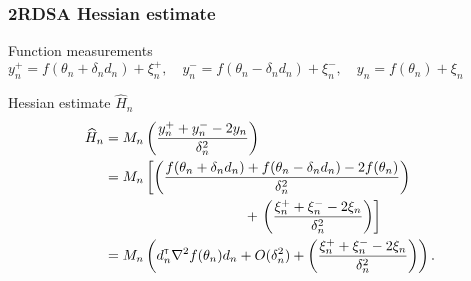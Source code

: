 \begin{frame}
\begin{small}
\frametitle{\centering 2RDSA Hessian estimate}
\begin{block}{Function measurements}
$y_{n}^+ = f(\theta_n+\delta_n d_n) + \xi_{n}^+,\quad y_{n}^- = f(\theta_n-\delta_n d_n) + \xi_{n}^-,\quad y_{n} = f(\theta_n) + \xi_{n}$
\end{block}
\begin{block}{Hessian estimate $\widehat H_n$} 
\begin{align}
\widehat H_n & = M_n \left(\dfrac{y_n^+ + y_n^- - 2 y_n}{\delta_n^2}\right) \nonumber \\
& =  M_n \left[\left(\dfrac{f(\theta_n+\delta_n d_n) + f(\theta_n-\delta_n d_n) - 2 f(\theta_n)}{\delta_n^2}\right) \right.\nonumber \\&\hspace{10em}+\left. \left(\dfrac{\xi_n^+ + \xi_n^- - 2 \xi_n}{\delta_n^2}\right)\right] \nonumber \\
& = M_n \left(d_n\tr \nabla^2 f(\theta_n) d_n +  O(\delta_n^2) + \left(\dfrac{\xi_n^+ + \xi_n^- - 2 \xi_n}{\delta_n^2} \right)\right).\label{eq:h0}
\end{align}
\end{block}
\end{small}
\end{frame}


